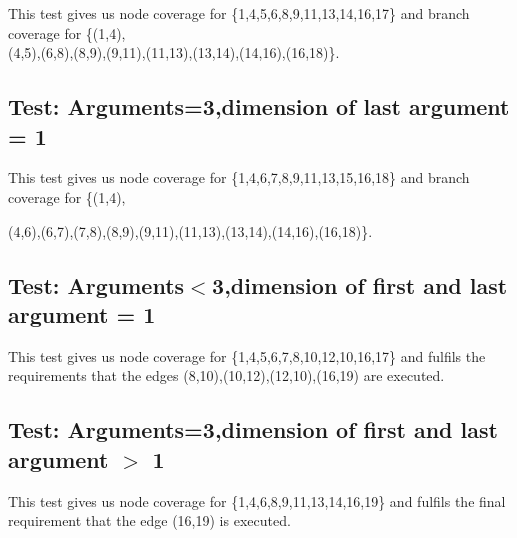 This test gives us node coverage for \{1,4,5,6,8,9,11,13,14,16,17\} and branch coverage for \{(1,4),
\\
(4,5),(6,8),(8,9),(9,11),(11,13),(13,14),(14,16),(16,18)\}.




\subsection{Test: Arguments=3,dimension of last argument = 1}


This test gives us node coverage for \{1,4,6,7,8,9,11,13,15,16,18\} and branch coverage for \{(1,4),

(4,6),(6,7),(7,8),(8,9),(9,11),(11,13),(13,14),(14,16),(16,18)\}.



\subsection{Test: Arguments$<$3,dimension of first and last argument = 1}


This test gives us node coverage for \{1,4,5,6,7,8,10,12,10,16,17\} and fulfils the requirements that the edges {(8,10),(10,12),(12,10),(16,19)} are executed.


\subsection{Test: Arguments=3,dimension of first and last argument $>$ 1}


This test gives us node coverage for \{1,4,6,8,9,11,13,14,16,19\} and fulfils the final requirement that the edge (16,19) is executed.


